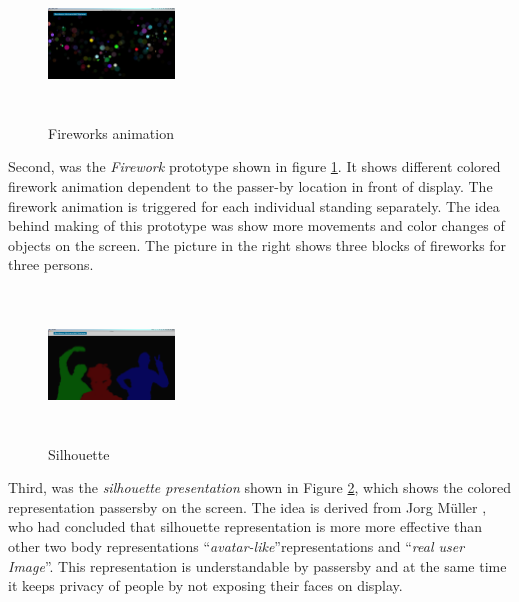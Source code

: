 \begin{figure}
  \vspace{-30pt}
  \begin{center}
    \includegraphics[width=0.3\textwidth,height=40mm]{Figures/3/fireworks}
  \end{center}
  \vspace{-20pt}
  \caption{Fireworks animation}          
  \label{fig:Attraction_firework}
  \vspace{-20pt}
\end{figure} 
Second, was the \emph{Firework} prototype shown in figure \ref{fig:Attraction_firework}.  It shows different colored firework animation dependent to the passer-by location in front of display. The firework animation is triggered for each individual standing separately. The idea behind making of this prototype was show more movements and color changes of objects on the screen. The picture in the right shows three blocks of fireworks for three persons.
\break
\break


\begin{figure}
  \vspace{-30pt}
  \begin{center}
    \includegraphics[width=0.3\textwidth,height=40mm]{Figures/3/silhouttee}
  \end{center}
  \vspace{-20pt}
  \caption{Silhouette}          
  \label{fig:Attraction_silhouette}
  \vspace{-20pt}
\end{figure} 
Third, was the \emph{silhouette presentation} shown in Figure \ref{fig:Attraction_silhouette}, which shows the colored representation passersby on the screen. The idea is derived from Jorg Müller \cite{LookingGlass}, who had concluded that silhouette representation is more more effective than other two body representations  ``\emph{avatar-like}''representations and ``\emph{real user Image}''. This representation is understandable by passersby  and at the same time it keeps privacy of people by not exposing their faces on display. 
\break
\break




